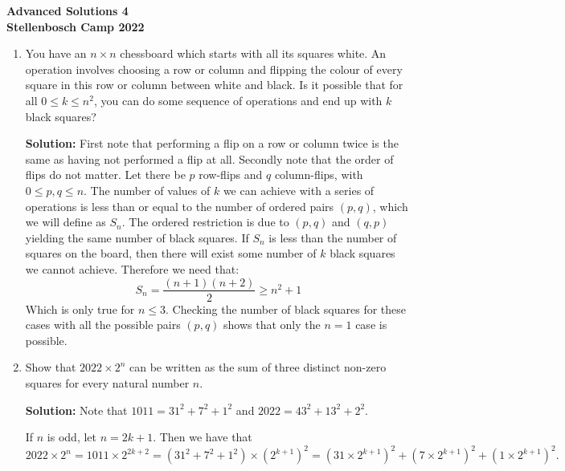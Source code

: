 \documentclass{article}
\begin{document}
\thispagestyle{empty}

\begin{center}
  \textbf{\Large Advanced Solutions 4}
  \\ \vspace{1em}
  \textbf{\large Stellenbosch Camp 2022}
  \\ \vspace{1em}
\end{center}

\bigskip \bigskip

\begin{enumerate}[itemsep=\fill]

\item %
You have an $n \times n$ chessboard which starts with all its squares white.
An operation involves choosing a row or column and flipping the colour of every square in this row or column between white and black.
Is it possible that for all $0 \leq k \leq n^2$, you can do some sequence of operations and end up with $k$ black squares?

\textbf{Solution:}
First note that performing a flip on a row or column twice is the same as having not performed a flip at all. Secondly note that the order of flips do not matter. Let there be $p$ row-flips and $q$ column-flips, with $0\leq p,q\leq n$. The number of values of $k$ we can achieve with a series of operations is less than or equal to the number of ordered pairs $(p,q)$, which we will define as $S_n$. The ordered restriction is due to $(p,q)$ and $(q,p)$ yielding the same number of black squares. If $S_n$ is less than the number of squares on the board, then there will exist some number of $k$ black squares we cannot achieve. Therefore we need that:
$$S_n = \frac{(n+1)(n+2)}{2} \geq n^2 + 1$$
Which is only true for $n\leq3$. Checking the number of black squares for these cases with all the possible pairs $(p,q)$ shows that only the $n=1$ case is possible.

\item %
Show that $2022 \times 2^n$ can be written as the sum of three distinct non-zero squares for every natural number $n$.

\textbf{Solution:}
Note that $1011 = 31^2 + 7^2 + 1^2$ and $2022 = 43^2 + 13^2 + 2^2$.

If $n$ is odd, let $n = 2k + 1$. Then we have that
\[
    2022 \times 2^n = 1011 \times 2^{2k + 2} = \left( 31^2 + 7^2 + 1^2 \right) \times {\left( 2^{k + 1} \right)}^2 = {\left( 31 \times 2^{k + 1} \right)}^2 + {\left( 7 \times 2^{k + 1} \right)}^2 + {\left( 1 \times 2^{k + 1} \right)}^2.
\]


\end{enumerate}
\end{document}
